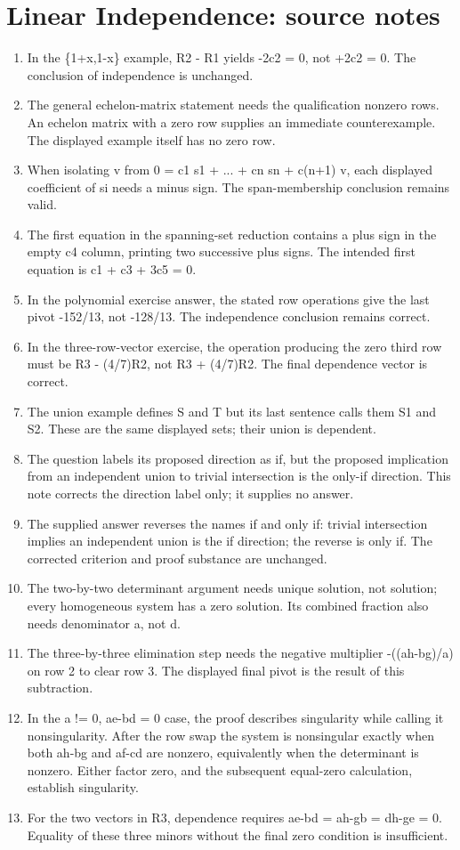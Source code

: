 \section*{Linear Independence: source notes}
\begin{enumerate}
\item In the \{1+x,1-x\} example, R2 - R1 yields -2c2 = 0, not +2c2 = 0. The conclusion of independence is unchanged.
\item The general echelon-matrix statement needs the qualification nonzero rows. An echelon matrix with a zero row supplies an immediate counterexample. The displayed example itself has no zero row.
\item When isolating v from 0 = c1 s1 + ... + cn sn + c(n+1) v, each displayed coefficient of si needs a minus sign. The span-membership conclusion remains valid.
\item The first equation in the spanning-set reduction contains a plus sign in the empty c4 column, printing two successive plus signs. The intended first equation is c1 + c3 + 3c5 = 0.
\item In the polynomial exercise answer, the stated row operations give the last pivot -152/13, not -128/13. The independence conclusion remains correct.
\item In the three-row-vector exercise, the operation producing the zero third row must be R3 - (4/7)R2, not R3 + (4/7)R2. The final dependence vector is correct.
\item The union example defines S and T but its last sentence calls them S1 and S2. These are the same displayed sets; their union is dependent.
\item The question labels its proposed direction as if, but the proposed implication from an independent union to trivial intersection is the only-if direction. This note corrects the direction label only; it supplies no answer.
\item The supplied answer reverses the names if and only if: trivial intersection implies an independent union is the if direction; the reverse is only if. The corrected criterion and proof substance are unchanged.
\item The two-by-two determinant argument needs unique solution, not solution; every homogeneous system has a zero solution. Its combined fraction also needs denominator a, not d.
\item The three-by-three elimination step needs the negative multiplier -((ah-bg)/a) on row 2 to clear row 3. The displayed final pivot is the result of this subtraction.
\item In the a != 0, ae-bd = 0 case, the proof describes singularity while calling it nonsingularity. After the row swap the system is nonsingular exactly when both ah-bg and af-cd are nonzero, equivalently when the determinant is nonzero. Either factor zero, and the subsequent equal-zero calculation, establish singularity.
\item For the two vectors in R3, dependence requires ae-bd = ah-gb = dh-ge = 0. Equality of these three minors without the final zero condition is insufficient.
\end{enumerate}

